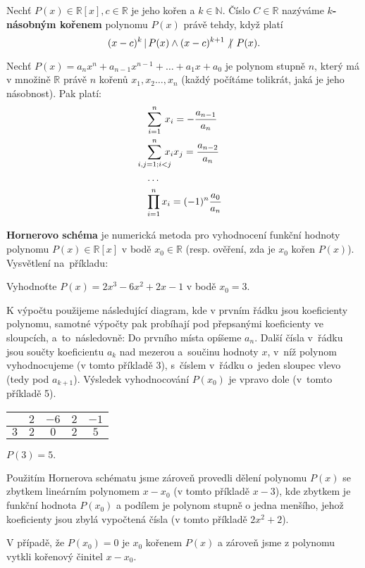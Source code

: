 \begin{definition}
  Nechť $P(x) \in \mathbb R [x], c \in \mathbb R$ je jeho kořen a $k \in \mathbb N$. Číslo $C \in \mathbb R$ nazýváme \textbf{$k$-násobným kořenem} polynomu $P(x)$ právě tehdy, když platí
  \[
    (x-c)^k \, | \, P(x) \land (x-c)^{k+1} \,\centernot |\,  P(x).
  \]
\end{definition}

\begin{veta}
  Nechť $P(x)=a_nx^n+a_{n-1}x^{n-1}+\dots + a_1x+a_0$ je polynom stupně $n$, který má v množině $\mathbb R$ právě $n$ kořenů $x_1,x_2\dots,x_n$ (každý počítáme tolikrát, jaká je jeho násobnost). Pak platí:
  \begin{align*}
    &\smashoperator[l]{\sum_{i=1}^n} \, x_i = -\frac{a_{n-1}}{a_n} \\
    &\smashoperator[l]{\sum_{i,j=1; i<j}^{n}}\!\!\!\!\! x_ix_j= \frac{a_{n-2}}{a_n} \\
    & \hdots \\
    &\smashoperator[l]{\prod_{i=1}^n}x_i=(-1)^n\frac{a_0}{a_n}
  \end{align*}
\end{veta}

\begin{pozn}
  \textbf{Hornerovo schéma} je numerická metoda pro vyhodnocení funkční hodnoty polynomu $P(x) \in \mathbb R [x]$ v bodě $ x_0 \in \mathbb R$ (resp. ověření, zda je $x_0$ kořen $P(x)$). Vysvětlení na~příkladu:
  \begin{center}
  Vyhodnoťte $P(x)=2x^{3}-6x^{2}+2x-1$ v bodě $x_0=3$.
  \end{center}
  K výpočtu použijeme následující diagram, kde v prvním řádku jsou koeficienty polynomu, samotné výpočty pak probíhají pod přepsanými koeficienty ve sloupcích, a~to~následovně:
  Do prvního místa opíšeme $a_n$. Další čísla v~řádku jsou součty koeficientu $a_k$ nad mezerou a~součinu hodnoty $x$, v~níž polynom vyhodnocujeme (v tomto příkladě 3), s~číslem v~řádku o~jeden sloupec vlevo (tedy pod $a_{k+1}$). Výsledek vyhodnocování $P(x_0)$ je vpravo dole (v~tomto příkladě 5).
  \begin{center}
    \begin{tabular}{ c|c c c c }
        $ $ & $2$ & $-6$ & $2$ & $-1$\\
        \hline
        $3$ & $2$ & $0$ & $2$ & $5$
    \end{tabular}

    $P(3) = 5.$
  \end{center}
  Použitím Hornerova schématu jsme zároveň provedli dělení polynomu $P(x)$ se zbytkem lineárním polynomem $x - x_0$ (v tomto příkladě $x-3$), kde zbytkem je funkční hodnota $P(x_0)$ a podílem je polynom stupně o jedna menšího, jehož koeficienty jsou zbylá vypočtená čísla (v tomto příkladě $2x^2+2$).

  V případě, že $P(x_0)=0$ je $x_0$ kořenem $P(x)$ a zároveň jsme z polynomu vytkli kořenový činitel $x-x_0$.
\end{pozn}

